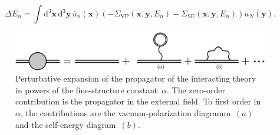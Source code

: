 \begin{equation}
\Delta E_n = \int \text{d}^3\mathbf{x}\,\text{d}^3\mathbf{y}\,\bar{u}_n(\mathbf{x})\left( -\Sigma_{\text{VP}}(\mathbf{x},\mathbf{y},E_n)-\Sigma_{\text{SE}}(\mathbf{x},\mathbf{y},E_n) \right)u_N(\mathbf{y}).
\end{equation}
%
\begin{figure}%
\centering
\includegraphics[width=0.9\linewidth]{pics/1loop.pdf}%
\caption{Perturbative expansion of the propagator of the interacting theory in powers of the fine-structure constant~$\alpha$. The zero-order contribution is the propagator in the external field. To first order in~$\alpha$, the contributions are the vacuum-polarization diagramm~$(a)$ and the self-energy diagram~$(b)$.}%
\label{fig:1loop}%
\end{figure}
%

